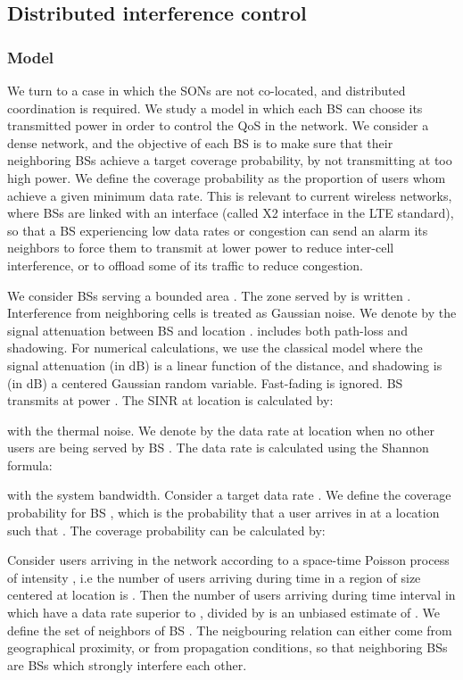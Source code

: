\documentclass[10pt,conference,letterpaper]{IEEEtran}
\begin{document}
\subsection{Distributed interference control}
\subsubsection{Model}
	We turn to a case in which the \acp{SON} are not co-located, and distributed coordination is required. We study a model in which each \ac{BS} can choose its transmitted power in order to control the \ac{QoS} in the network. We consider a dense network, and the objective of each \ac{BS} is to make sure that their neighboring \acp{BS} achieve a target coverage probability, by not transmitting at too high power. We define the coverage probability as the proportion of users whom achieve a given minimum data rate. This is relevant to current wireless networks, where \acp{BS} are linked with an interface (called X2 interface in the \ac{LTE} standard), so that a \ac{BS} experiencing low data rates or congestion can send an alarm its neighbors to force them to transmit at lower power to reduce inter-cell interference, or to offload some of its traffic to reduce congestion.
	
	We consider  \acp{BS} serving a bounded area . The zone served by   is written . Interference from neighboring cells is treated as Gaussian noise. We denote by  the signal attenuation between \ac{BS}   and location .  includes both path-loss and shadowing. For numerical calculations, we use the classical model where the signal attenuation (in dB) is a linear function of the distance, and shadowing is (in dB) a centered Gaussian random variable. Fast-fading is ignored. \ac{BS}  transmits at power . The \ac{SINR} at location  is calculated by:

with  the thermal noise.
	We denote by  the data rate at location  when no other users are being served by \ac{BS} . The data rate  is calculated using the Shannon formula:

with  the system bandwidth. Consider a target data rate . We define  the coverage probability for \ac{BS} , which is the probability that a user arrives in  at a location  such that . The coverage probability can be calculated by:

	Consider users arriving in the network according to a space-time Poisson process of intensity , i.e the number of users arriving during time  in a region of size  centered at location  is . Then the number of users arriving during time interval  in  which have a data rate superior to , divided by  is an unbiased estimate of . We define  the set of neighbors of \ac{BS} . The neigbouring relation can either come from geographical proximity, or from propagation conditions, so that neighboring \acp{BS} are \acp{BS} which strongly interfere each other.
 	
\end{document}
